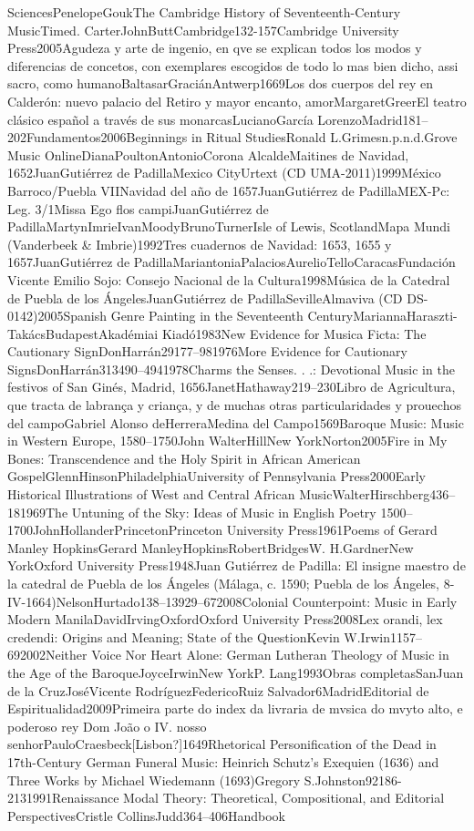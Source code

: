\documentclass{memoir}
\begin{document}
{{{{{{{{SciencesPenelopeGoukThe Cambridge History of Seventeenth-Century MusicTimed. CarterJohnButtCambridge132-157Cambridge University Press2005Agudeza y arte de ingenio, en qve se explican todos los modos y diferencias de concetos, con exemplares escogidos de todo lo mas bien dicho, assi sacro, como humanoBaltasarGraciánAntwerp1669Los dos cuerpos del rey en Calderón: \mkbibemphEl nuevo palacio del Retiro y \mkbibemphEl mayor encanto, amorMargaretGreerEl teatro clásico español a través de sus monarcasLucianoGarcía LorenzoMadrid181–202Fundamentos2006Beginnings in Ritual StudiesRonald L.Grimesn.p.n.d.Grove Music OnlineDianaPoultonAntonioCorona AlcaldeMaitines de Navidad, 1652JuanGutiérrez de PadillaMexico CityUrtext (CD UMA-2011)1999México Barroco/Puebla VIINavidad del año de 1657JuanGutiérrez de PadillaMEX-Pc: Leg. 3/1Missa Ego flos campiJuanGutiérrez de PadillaMartynImrieIvanMoodyBrunoTurnerIsle of Lewis, ScotlandMapa Mundi (Vanderbeek & Imbrie)1992Tres cuadernos de Navidad: 1653, 1655 y 1657JuanGutiérrez de PadillaMariantoniaPalaciosAurelioTelloCaracasFundación Vicente Emilio Sojo: Consejo Nacional de la Cultura1998Música de la Catedral de Puebla de los ÁngelesJuanGutiérrez de PadillaSevilleAlmaviva (CD DS-0142)2005Spanish Genre Painting in the Seventeenth CenturyMariannaHaraszti-TakácsBudapestAkadémiai Kiadó1983New Evidence for Musica Ficta: The Cautionary SignDonHarrán29177–981976More Evidence for Cautionary SignsDonHarrán313490–4941978\mkbibquoteMusic Charms the Senses. . .: Devotional Music in the \mkbibemphTriunfos festivos of San Ginés, Madrid, 1656JanetHathaway219–230Libro de Agricultura, que tracta de labrança y criança, y de muchas otras particularidades y prouechos del campoGabriel Alonso deHerreraMedina del Campo1569Baroque Music: Music in Western Europe, 1580–1750John WalterHillNew YorkNorton2005Fire in My Bones: Transcendence and the Holy Spirit in African American GospelGlennHinsonPhiladelphiaUniversity of Pennsylvania Press2000Early Historical Illustrations of West and Central African MusicWalterHirschberg436–181969The Untuning of the Sky: Ideas of Music in English Poetry 1500–1700JohnHollanderPrincetonPrinceton University Press1961Poems of Gerard Manley HopkinsGerard ManleyHopkinsRobertBridgesW. H.GardnerNew YorkOxford University Press1948Juan Gutiérrez de Padilla: El insigne maestro de la catedral de Puebla de los Ángeles (Málaga, c. 1590; Puebla de los Ángeles, 8-IV-1664)NelsonHurtado138–13929–672008Colonial Counterpoint: Music in Early Modern ManilaDavidIrvingOxfordOxford University Press2008Lex orandi, lex credendi: Origins and Meaning; State of the QuestionKevin W.Irwin1157–692002Neither Voice Nor Heart Alone: German Lutheran Theology of Music in the Age of the BaroqueJoyceIrwinNew YorkP. Lang1993Obras completasSanJuan de la CruzJoséVicente RodríguezFedericoRuiz Salvador6MadridEditorial de Espiritualidad2009Primeira parte do index da livraria de mvsica do mvyto alto, e poderoso rey Dom João o IV. nosso senhorPauloCraesbeck[Lisbon?]1649Rhetorical Personification of the Dead in 17th-Century German Funeral Music: Heinrich Schutz's \mkbibemphMusikalische Exequien (1636) and Three Works by Michael Wiedemann (1693)Gregory S.Johnston92186-2131991Renaissance Modal Theory: Theoretical, Compositional, and Editorial PerspectivesCristle CollinsJudd364–406Handbook }}}}}}}}
\end{document}
